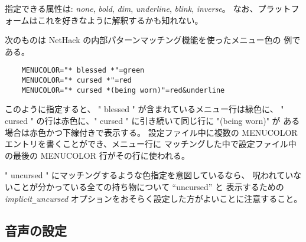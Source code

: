 指定できる属性は:
{\it none}, {\it bold}, {\it dim}, {\it underline},
{\it blink}, {\it inverse}。
なお、プラットフォームはこれを好きなように解釈するかも知れない。

次のものは NetHack の内部パターンマッチング機能を使ったメニュー色の
例である。

\begin{verbatim}
    MENUCOLOR="* blessed *"=green
    MENUCOLOR="* cursed *"=red
    MENUCOLOR="* cursed *(being worn)"=red&underline
\end{verbatim}

このように指定すると、 " blessed " が含まれているメニュー行は緑色に、
" cursed " の行は赤色に、" cursed " に引き続いて同じ行に "(being worn)" が
ある場合は赤色かつ下線付きで表示する。
設定ファイル中に複数の MENUCOLOR エントリを書くことができ、メニュー行に
マッチングした中で設定ファイル中の最後の MENUCOLOR 行がその行に使われる。

" uncursed " にマッチングするような色指定を意図しているなら、
呪われていないことが分かっている全ての持ち物について ``uncursed'' と
表示するための
{\it implicit\verb+_+uncursed\/}
オプションをおそらく設定した方がよいことに注意すること。

\subsection*{音声の設定}

